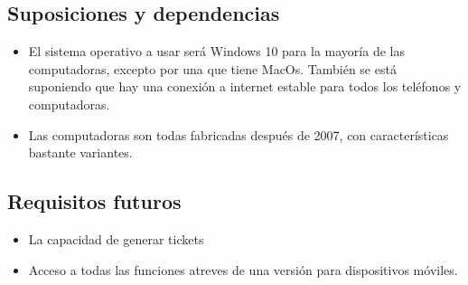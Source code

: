 \subsection{Suposiciones y dependencias}
\begin{itemize}
\item El sistema operativo a usar será Windows 10 para la mayoría de las computadoras, excepto por una que tiene MacOs. También se está suponiendo que hay una conexión a internet estable para todos los teléfonos y computadoras.
\item Las computadoras son todas fabricadas después de 2007, con características bastante variantes.
\end{itemize}

\subsection{Requisitos futuros}
\begin{itemize}
\item La capacidad de generar tickets
\item Acceso a todas las funciones atreves de una versión para dispositivos móviles.
\end{itemize}


